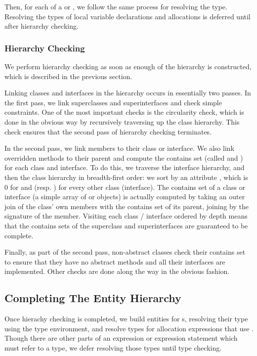 \documentclass[pdftex,11pt,a4paper]{article}
\begin{document}
Then, for each  of a  or
, we follow the same process for resolving the
type. Resolving the types of local variable declarations and
allocations is deferred until after hierarchy checking.

\subsubsection{Hierarchy Checking}

We perform hierarchy checking as soon as enough of the hierarchy is
constructed, which is described in the previous section.

Linking classes and interfaces in the hierarchy occurs in essentially
two passes. In the first pass, we link superclasses and
superinterfaces and check simple constraints. One of the most
important checks is the circularity check, which is done in the
obvious way by recursively traversing up the class hierarchy. This
check ensures that the second pass of hierarchy checking terminates.

In the second pass, we link members to their class or interface. We also link
overridden methods to their parent and compute the contains set (called
 and ) for each class and interface. To do
this, we traverse the interface hierarchy, and then the class hierarchy in
breadth-first order: we sort by an attribute , which is 0 for
 and  (resp. ) for every other class (interface). The contains set
of a class or interface (a simple array of  or  objects)
is actually computed by taking an outer join of the class' own members with the
contains set of its parent, joining by the signature of the member.  Visiting
each class / interface ordered by depth means that the contains sets of the
superclass and superinterfaces are guaranteed to be complete.

Finally, as part of the second pass, non-abstract classes check their
contains set to ensure that they have no abstract methods and all
their interfaces are implemented. Other checks are done along the way
in the obvious fashion.

\subsection{Completing The Entity Hierarchy}

Once hierachy checking is completed, we build entities for
s, resolving their type using the type
environment, and resolve types for allocation expressions that use
. Though there are other parts of an expression or expression
statement which must refer to a type, we defer resolving those types
until type checking.
\end{document}
